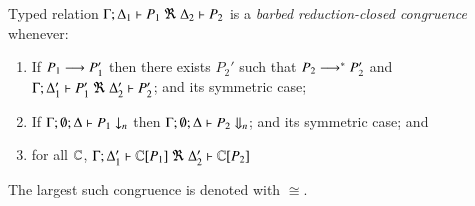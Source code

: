 \begin{definition}\rm
	Typed relation
	$\horel{\Gamma}{\Delta_1}{P_1}{\ \Re\ }{\Delta_2}{P_2}$
	is a {\em barbed reduction-closed congruence} whenever:
	\begin{enumerate}
	\item	If $P_1 \longrightarrow P_1'$ then there exists $P_2'$ such that $P_2 \longrightarrow^* P_2'$ and
	$\horel{\Gamma}{\Delta_1'}{P_1'}{\ \Re\ }{\Delta_2'}{P_2'}$; 
and its symmetric case;

			\item	If $\Gamma;\emptyset;\Delta \vdash P_1 \downarrow_{n}$ then $\Gamma;\emptyset;\Delta \vdash P_2 \Downarrow_{n}$; and its symmetric case; and 


		\item	for all ${\Bbb C}$, $\horel{\Gamma}{\Delta_1'}{\context{\C}{P_1}}{\ \Re\ }{\Delta_2'}{\context{\C}{P_2}}$
	\end{enumerate}
	The largest such congruence is denoted with $\cong$.
\end{definition}

